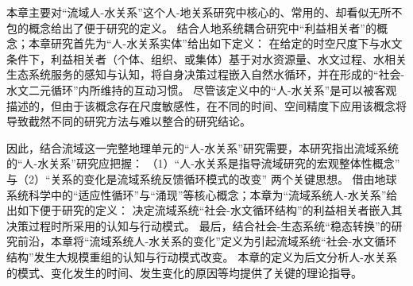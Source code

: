 本章主要对“流域人-水关系”这个人-地关系研究中核心的、常用的、却看似无所不包的概念给出了便于研究的定义。
结合人地系统耦合研究中“利益相关者”的概念；本章研究首先为“人-水关系实体”给出如下定义：
在给定的时空尺度下与水文条件下，利益相关者（个体、组织、或集体）基于对水资源量、水文过程、水相关生态系统服务的感知与认知，将自身决策过程嵌入自然水循环，并在形成的“社会-水文二元循环”内所维持的互动习惯。
尽管该定义中的“人-水关系”是可以被客观描述的，但由于该概念存在尺度敏感性，在不同的时间、空间精度下应用该概念将导致截然不同的研究方法与难以整合的研究结论。

因此，结合流域这一完整地理单元的“人-水关系”研究需要，本研究指出流域系统的“人-水关系”研究应把握：
（1）“人-水关系是指导流域研究的宏观整体性概念”
与（2）“关系的变化是流域系统反馈循环模式的改变”
两个关键思想。
借由地球系统科学中的“适应性循环”与“涌现”等核心概念；本章为“流域系统人-水关系”给出如下便于研究的定义：
决定流域系统“社会-水文循环结构”的利益相关者嵌入其决策过程时所采用的认知与行动模式。
最后，结合社会-生态系统“稳态转换”的研究前沿，本章将“流域系统人-水关系的变化”定义为引起流域系统“社会-水文循环结构”发生大规模重组的认知与行动模式改变。
本章的定义为后文分析人-水关系的模式、变化发生的时间、发生变化的原因等均提供了关键的理论指导。

